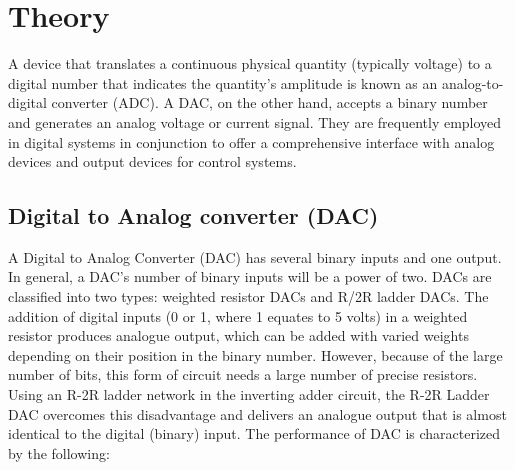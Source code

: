 \section{Theory}
	A device that translates a continuous physical quantity (typically voltage) to a digital number that indicates the quantity's amplitude is known as an analog-to-digital converter (ADC). A DAC, on the other hand, accepts a binary number and generates an analog voltage or current signal. They are frequently employed in digital systems in conjunction to offer a comprehensive interface with analog devices and output devices for control systems.
	\subsection{Digital to Analog converter (DAC)}
		A Digital to Analog Converter (DAC) has several binary inputs and one output. In general, a DAC's number of binary inputs will be a power of two. DACs are classified into two types: weighted resistor DACs and R/2R ladder DACs. The addition of digital inputs (0 or 1, where 1 equates to 5 volts) in a weighted resistor produces analogue output, which can be added with varied weights depending on their position in the binary number. However, because of the large number of bits, this form of circuit needs a large number of precise resistors. Using an R-2R ladder network in the inverting adder circuit, the R-2R Ladder DAC overcomes this disadvantage and delivers an analogue output that is almost identical to the digital (binary) input. The performance of DAC is characterized by the following:
